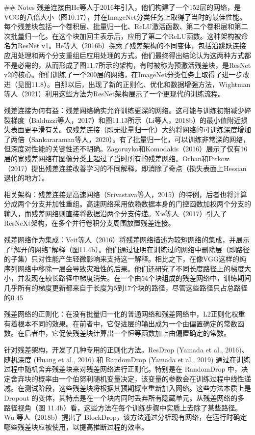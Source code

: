 ## Notes
残差连接由He等人于2016年引入，他们构建了一个152层的网络，是VGG的八倍大小（图10.17），并在ImageNet分类任务上取得了当时的最佳性能。每个残差块包括一个卷积层、批量归一化、ReLU激活函数、第二个卷积层和第二次批量归一化。在这个块加回主表示后，应用了第二个ReLU函数。这种架构被命名为ResNet v1。He等人（2016b）探索了残差架构的不同变体，包括沿跳跃连接应用处理和两个分支重组后应用处理的方式。他们最终得出结论认为这两种方式都不是必需的，从而形成了图11.7所示的架构，有时被称为预激活残差块，是ResNet v2的核心。他们训练了一个200层的网络，在ImageNet分类任务上取得了进一步改进（见图11.8）。自那以后，出现了新的正则化、优化和数据增强方法，Wightman等人（2021）利用这些方法为ResNet架构展示了一个更现代的训练流程。

残差连接为何有益：残差网络确实允许训练更深的网络。这可能与训练初期减少碎裂梯度（Balduzzi等人，2017）和图11.13所示（Li等人，2018b）的最小值附近损失表面更平滑有关。仅残差连接（即无批量归一化）大约将网络的可训练深度增加了两倍（Sankararaman等人，2020）。有了批量归一化，可以训练非常深的网络，但深度对性能的关键性还不明确。Zagoruyko和Komodakis（2016）展示了仅有16层的宽残差网络在图像分类上超过了当时所有的残差网络。Orhan和Pitkow（2017）提出残差连接改善学习的不同解释，即消除了奇点（损失表面上Hessian退化的地方）。

相关架构：残差连接是高速网络（Srivastava等人，2015）的特例，后者也将计算分成两个分支并加性重组。高速网络采用依赖数据本身的门控函数加权两个分支的输入，而残差网络则直接将数据沿两个分支传递。Xie等人（2017）引入了ResNeXt架构，在多个并行卷积分支周围放置残差连接。

残差网络作为集成：Veit等人（2016）将残差网络描述为较短网络的集成，并展示了“解开的网络”解释（图11.4b）。他们通过证明在训练过的网络中删除层（即路径的子集）只对性能产生轻微影响来支持这一解释。相比之下，在像VGG这样的纯序列网络中移除一层会导致灾难性的后果。他们还研究了不同长度路径上的梯度大小，并发现在较长路径中梯度消失。在一个由54个块组成的残差网络中，训练期间几乎所有的梯度更新都来自于长度为5到17个块的路径，尽管这些路径只占总路径的0.45%

残差网络的正则化：在没有批量归一化的普通网络和残差网络中，L2正则化权重有着根本不同的效果。在前者中，它促进层的输出成为一个由偏置确定的常数函数。在后者中，它促使残差块计算出一个恒等函数加上由偏置确定的常数。

针对残差架构，开发了几种专用的正则化方法。ResDrop (Yamada et al., 2016)、随机深度 (Huang et al., 2016) 和 RandomDrop (Yamada et al., 2019) 通过在训练过程中随机舍弃残差块来对残差网络进行正则化。特别是在 RandomDrop 中，决定舍弃块的概率由一个伯努利随机变量决定，该变量的参数会在训练过程中线性递减。在测试阶段，这些残差块将根据其预期概率重新加入网络。这些方法本质上是 Dropout 的变体，其特点是在一个块内同时丢弃所有隐藏单元。从残差网络的多路径视角（图 11.4b）看，这些方法在每个训练步骤中实质上去除了某些路径。Wu 等人（2018b）提出了 BlockDrop，该方法通过分析现有网络，在运行时确定哪些残差块应被使用，以提高推断过程的效率。

